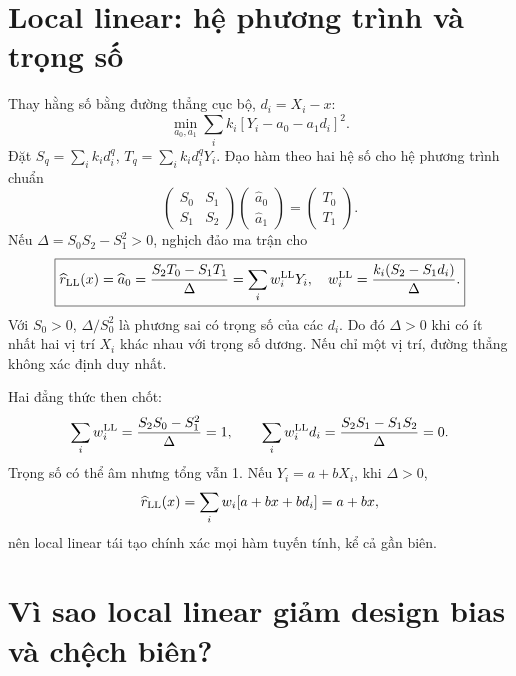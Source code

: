 \section{Local linear: hệ phương trình và trọng số}
Thay hằng số bằng đường thẳng cục bộ, $d_i=X_i-x$:
\[
\min_{a_0,a_1}\sum_i k_i[Y_i-a_0-a_1d_i]^2.
\]
Đặt $S_q=\sum_i k_id_i^q$, $T_q=\sum_i k_id_i^qY_i$.
Đạo hàm theo hai hệ số cho hệ phương trình chuẩn
\[
\begin{pmatrix}S_0&S_1\\S_1&S_2\end{pmatrix}
\begin{pmatrix}\widehat a_0\\\widehat a_1\end{pmatrix}
=\begin{pmatrix}T_0\\T_1\end{pmatrix}.
\]
Nếu $\Delta=S_0S_2-S_1^2>0$, nghịch đảo ma trận cho
\[
\boxed{\widehat r_{\rm LL}(x)=\widehat a_0
=\frac{S_2T_0-S_1T_1}{\Delta}
=\sum_iw_i^{\rm LL}Y_i,\quad
w_i^{\rm LL}=\frac{k_i(S_2-S_1d_i)}\Delta.}
\]
Với $S_0>0$, $\Delta/S_0^2$ là phương sai có trọng số của các $d_i$.
Do đó $\Delta>0$ khi có ít nhất hai vị trí $X_i$ khác nhau với trọng số
dương. Nếu chỉ một vị trí, đường thẳng không xác định duy nhất.

Hai đẳng thức then chốt:
\[
\sum_iw_i^{\rm LL}=\frac{S_2S_0-S_1^2}\Delta=1,\qquad
\sum_iw_i^{\rm LL}d_i=\frac{S_2S_1-S_1S_2}\Delta=0.
\]
Trọng số có thể âm nhưng tổng vẫn 1. Nếu $Y_i=a+bX_i$, khi $\Delta>0$,
\[
\widehat r_{\rm LL}(x)=\sum_iw_i[a+bx+bd_i]=a+bx,
\]
nên local linear tái tạo chính xác mọi hàm tuyến tính, kể cả gần biên.

\section{Vì sao local linear giảm design bias và chệch biên?}
